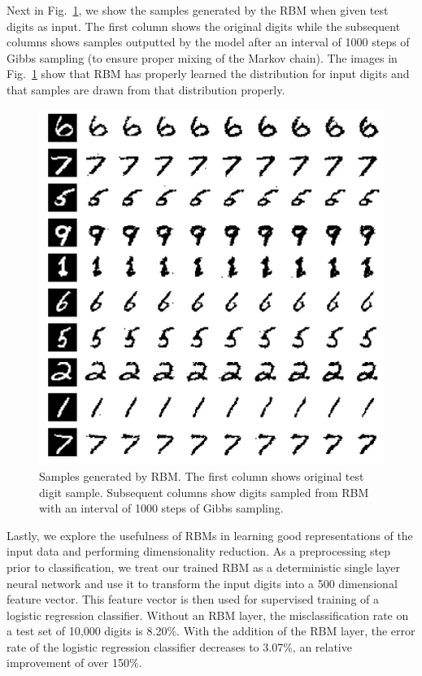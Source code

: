 \documentclass[journal]{IEEEtran}
\begin{document}
Next in Fig.~\ref{samples}, we show the samples generated by the RBM when given test digits as input. The first column shows the original digits while the subsequent columns shows samples outputted by the model after an interval of 1000 steps of Gibbs sampling (to ensure proper mixing of the Markov chain). The images in Fig.~\ref{samples} show that RBM has properly learned the distribution for input digits and that samples are drawn from that distribution properly. 

\begin{figure}[h]
  \centering
  \includegraphics[width=0.9\linewidth]{samples.png}
  \caption{Samples generated by RBM. The first column shows original test digit sample. Subsequent columns show digits sampled from RBM with an interval of 1000 steps of Gibbs sampling.}
  \label{samples}
\end{figure}

Lastly, we explore the usefulness of RBMs in learning good representations of the input data and performing dimensionality reduction. As a preprocessing step prior to classification, we treat our trained RBM as a deterministic single layer neural network and use it to transform the input digits into a 500 dimensional feature vector. This feature vector is then used for supervised training of a logistic regression classifier. Without an RBM layer, the misclassification rate on a test set of 10,000 digits is 8.20\%. With the addition of the RBM layer, the error rate of the logistic regression classifier decreases to 3.07\%, an relative improvement of over 150\%.
\end{document}
